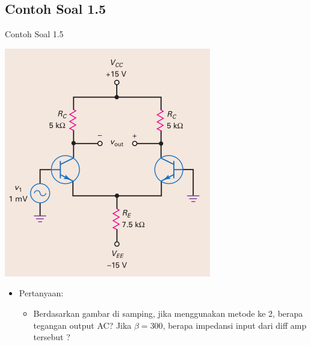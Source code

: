 \documentclass[aspectratio=169]{beamer}
\begin{document}
\subsection{Contoh Soal 1.5}
\begin{frame}{Contoh Soal 1.5}
	\begin{multicols}{2}
		\begin{center}
			\includegraphics[height=0.7\textheight]{gambar/01.contoh_soal_1-2}
		\end{center}
		\columnbreak
		\begin{itemize}
			\item Pertanyaan:
			\begin{itemize}
				\item Berdasarkan gambar di samping, jika menggunakan metode ke 2, berapa tegangan output AC? Jika $ \beta = 300 $, berapa impedansi input dari diff amp tersebut ?
			\end{itemize}
		\end{itemize}
	\end{multicols}
\end{frame}
\end{document}
